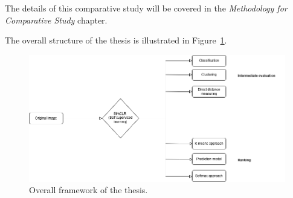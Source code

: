 The details of this comparative study will be covered in the \textit{Methodology for Comparative Study} chapter.

The overall structure of the thesis is illustrated in Figure~\ref{fig:BigOutline}.

\begin{figure}[H]
  \centering
  \includegraphics[scale=0.46]{figures/BigOutline.drawio.png} 
  \caption{Overall framework of the thesis.}
  \label{fig:BigOutline}
\end{figure}

